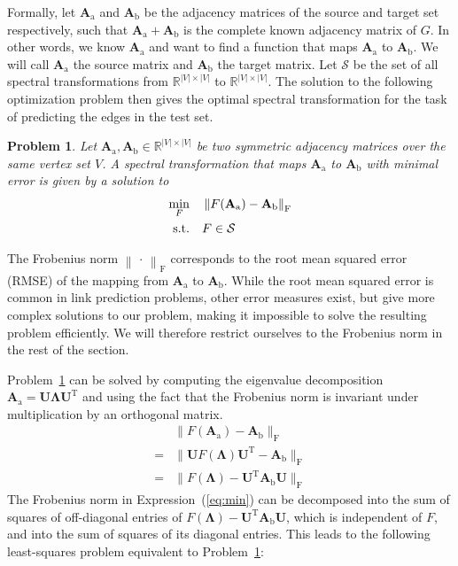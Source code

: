\documentclass[11pt,a4paper]{book}
\newtheorem{problem}{Problem}
\begin{document}
Formally, let $\mathbf A_{\mathrm a}$ and $\mathbf A_{\mathrm b}$ be the
adjacency matrices of the source and target set respectively, such that
$\mathbf A_{\mathrm a}+ \mathbf A_{\mathrm b}$ is the complete known
adjacency matrix of $G$.  In other words, we know $\mathbf A_{\mathrm
  a}$ and want to find a function that maps $\mathbf A_{\mathrm a}$ to
$\mathbf A_{\mathrm b}$.  We will call $\mathbf A_{\mathrm a}$ the
source matrix and $\mathbf A_{\mathrm b}$ the target matrix.  Let
$\mathcal S$ be the set of all spectral transformations from
$\mathbb{R}^{|V|\times |V|}$ to $\mathbb{R}^{|V|\times |V|}$.  The
solution to the following optimization problem then gives the optimal
spectral transformation for the task of predicting the edges in the test
set.
\begin{problem}
  \label{pb:1}
  Let $\mathbf A_{\mathrm a}, \mathbf A_{\mathrm b} \in \mathbb{R}^{|V|\times |V|}$ 
  be two symmetric adjacency matrices over the same vertex set $V$.  
  A spectral transformation that
  maps $\mathbf A_{\mathrm a}$ to $\mathbf A_{\mathrm b}$ with minimal error is given by a
  solution to
  \begin{align}
    \min_F \quad & \left\| F(\mathbf A_{\mathrm a}) - \mathbf A_{\mathrm b} \right\|
    _{\mathrm F}  \label{eq:min-spectral-transformation-error} \\
    \textnormal{s.t.} \quad &  F \in \mathcal S \nonumber
  \end{align}
\end{problem}
The Frobenius norm $\left\|\, \cdot\, \right\|_{\mathrm F}$ corresponds
to the root mean squared error (RMSE) of the mapping from $\mathbf A_{\mathrm a}$
to $\mathbf A_{\mathrm b}$.   
While the root mean squared error is common in link prediction problems,
other error 
measures exist, but give more complex solutions to our problem, making
it impossible to solve the resulting problem efficiently.  We will therefore
restrict ourselves to the Frobenius norm in the rest of the section.  

Problem~\ref{pb:1} can be solved by computing the eigenvalue
decomposition $\mathbf A_{\mathrm a}=\mathbf U\mathbf \Lambda \mathbf U^{\mathrm
  T}$ and using the fact that the Frobenius norm 
is invariant under multiplication by an orthogonal matrix. 
\begin{align}
  &  \big\| F(\mathbf A_{\mathrm a})-\mathbf A_{\mathrm b}\big\|_{\mathrm F} \label{eq:min}  \\
  =& \big\| \mathbf U F(\mathbf \Lambda)\mathbf U^{\mathrm T} - \mathbf
  A_{\mathrm b}\big\|_{\mathrm F} \nonumber \\
  =& \big\| F(\mathbf \Lambda) - \mathbf U^{\mathrm T} \mathbf A_{\mathrm b} \mathbf
  U\big\|_{\mathrm F}  \nonumber
\end{align}
The Frobenius norm in Expression~(\ref{eq:min}) can be decomposed into
the sum of squares of off-diagonal entries of $F(\mathbf
\Lambda)-\mathbf U^{\mathrm T}\mathbf A_{\mathrm b}\mathbf U$, which is independent of $F$,
and into the sum of squares of its diagonal entries.  This leads to the
following least-squares problem equivalent to Problem~\ref{pb:1}:
\end{document}

